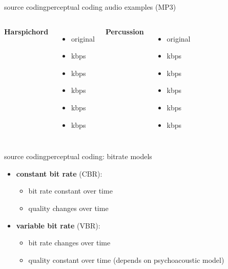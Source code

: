 	\begin{frame}{source coding}{perceptual coding audio examples (MP3)}
        \begin{columns}
            \textbf{Harspichord}
                \begin{itemize}
                    \item   original 
                    \item   \unit[256]{kbps} 
                    \item   \unit[128]{kbps} 
                    \item   \unit[96]{kbps} 
                    \item   \unit[64]{kbps} 
                    \item   \unit[32]{kbps} 
                \end{itemize}
            \textbf{Percussion}
                \begin{itemize}
                    \item   original 
                    \item   \unit[256]{kbps} 
                    \item   \unit[128]{kbps} 
                    \item   \unit[96]{kbps} 
                    \item   \unit[64]{kbps} 
                    \item   \unit[32]{kbps} 
                \end{itemize}
        \end{columns}
	\end{frame}
	
	\begin{frame}{source coding}{perceptual coding: bitrate models}
		\begin{itemize}	
			\item	\textbf{constant bit rate} (CBR):
					\begin{itemize}
						\item	bit rate constant over time
						\item	quality changes over time
					\end{itemize}
			\bigskip
            \item	\textbf{variable bit rate} (VBR):
					\begin{itemize}
						\item	bit rate changes over time
						\item	quality constant over time (depends on psychoacoustic model)
					\end{itemize}
		\end{itemize}
	\end{frame}		

